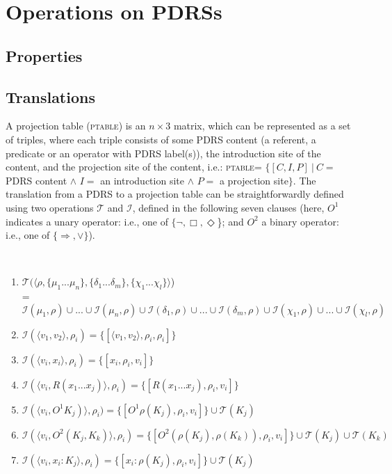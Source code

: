 \section{Operations on PDRSs}\label{sec:operations}

\subsection{Properties}



\subsection{Translations}

A projection table (\textsc{ptable}) is an $n\times3$ matrix, which can be
represented as a set of triples, where each triple consists of some PDRS
content (a referent, a predicate or an operator with PDRS label(s)), the
introduction site of the content, and the projection site of the content,
i.e.: \textsc{ptable}= $\{[C,I,P]~|~C=$ PDRS content $\wedge$ $I=$ an
introduction site $\wedge$ $P=$ a projection site$\}$. The translation from
a PDRS to a projection table can be straightforwardly defined using two
operations $\mathcal{T}$ and $\mathcal{I}$, defined in the following seven
clauses (here, $O^1$ indicates a unary operator: i.e., one of $\{\neg, \Box,
\Diamond$\}; and $O^2$ a binary operator: i.e., one of $\{\Rightarrow,
\vee\}$).

\begin{definition}~\\\vspace{-12pt}
\begin{enumerate}
  \item $\mathcal{T}(\langle\rho,\{\mu_1...\mu_n\},
    \{\delta_1...\delta_m\}, \{\chi_1...\chi_l\}\rangle$)\\
    = $\mathcal{I}(\mu_1,\rho)\cup...\cup \mathcal{I}(\mu_n,\rho)\cup
      \mathcal{I}(\delta_1,\rho)\cup...\cup \mathcal{I}(\delta_m,\rho)\cup
      \mathcal{I}(\chi_1,\rho)\cup...\cup \mathcal{I}(\chi_l,\rho)$
  \item $\mathcal{I}(\langle v_1, v_2 \rangle,\rho_i)
    = \{[\langle v_1, v_2 \rangle,\rho_i,\rho_i]\}$
  \item $\mathcal{I}(\langle v_i, x_i \rangle,\rho_i)
    = \{[x_i,\rho_i,v_i]\}$
  \item $\mathcal{I}(\langle v_i, R(x_1...x_j) \rangle,\rho_i)
    = \{[R(x_1...x_j),\rho_i,v_i]\}$
  \item $\mathcal{I}(\langle v_i, O^1 K_j) \rangle,\rho_i)
    = \{[O^1 \rho(K_j),\rho_i,v_i]\} \cup \mathcal{T}(K_j)$
  \item $\mathcal{I}(\langle v_i,  O^2(K_j, K_k) \rangle,\rho_i)
    = \{[O^2(\rho(K_j),\rho(K_k)),\rho_i,v_i]\} \cup \mathcal{T}(K_j)
      \cup \mathcal{T}(K_k)$
  \item $\mathcal{I}(\langle v_i, x_i:K_j \rangle,\rho_i)
    = \{[x_i:\rho(K_j),\rho_i,v_i]\} \cup \mathcal{T}(K_j)$
\end{enumerate}
\end{definition}

